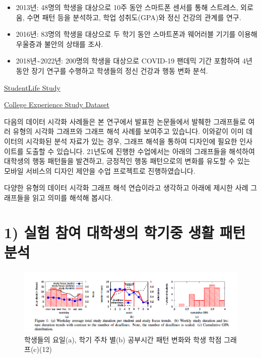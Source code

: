 \documentclass[
  letterpaper,
]{book}
\providecommand{\tightlist}{%
  \setlength{\itemsep}{0pt}\setlength{\parskip}{0pt}}\usepackage{longtable,booktabs,array}
\begin{document}
\begin{itemize}
\tightlist
\item
  2013년: 48명의 학생을 대상으로 10주 동안 스마트폰 센서를 통해
  스트레스, 외로움, 수면 패턴 등을 분석하고, 학업 성취도(GPA)와 정신
  건강의 관계를 연구.
\item
  2016년: 83명의 학생을 대상으로 두 학기 동안 스마트폰과 웨어러블 기기를
  이용해 우울증과 불안의 상태를 조사.
\item
  2018년\textasciitilde2022년: 200명의 학생을 대상으로 COVID-19 팬데믹
  기간 포함하여 4년 동안 장기 연구를 수행하고 학생들의 정신 건강과 행동
  변화 분석.
\end{itemize}

\href{https://studentlife.cs.dartmouth.edu}{StudentLife Study}

\href{https://www.kaggle.com/datasets/subigyanepal/college-experience-dataset?resource=download}{College
Experience Study Dataset}

다음의 데이터 시각화 사례들은 본 연구에서 발표한 논문들에서 발췌한
그래프들로 여러 유형의 시각화 그래프와 그래프 해석 사례를 보여주고
있습니다. 이와같이 이미 데이터의 시각화된 분석 자료가 있는 경우, 그래프
해석을 통하여 디자인에 필요한 인사이트를 도출할 수 있습니다. 21년도에
진행한 수업에서는 아래의 그래프들을 해석하여 대학생의 행동 패턴들을
발견하고, 긍정적인 행동 패턴으로의 변화를 유도할 수 있는 모바일 서비스의
디자인 제안을 수업 프로젝트로 진행하였습니다.

다양한 유형의 데이터 시각화 그래프 해석 연습이라고 생각하고 아래에
제시한 사례 그래프들을 읽고 의미를 해석해 봅시다.

\section{1) 실험 참여 대학생의 학기중 생활 패턴
분석}\label{uxc2e4uxd5d8-uxcc38uxc5ec-uxb300uxd559uxc0dduxc758-uxd559uxae30uxc911-uxc0dduxd65c-uxd328uxd134-uxbd84uxc11d}

\begin{figure}[H]

{\centering \includegraphics{img/fig8.png}

}

\caption{학생들의 요일(a), 학기 주차 별(b) 공부시간 패턴 변화와 학생
학점 그래프(c)(12)}

\end{figure}%
\end{document}

